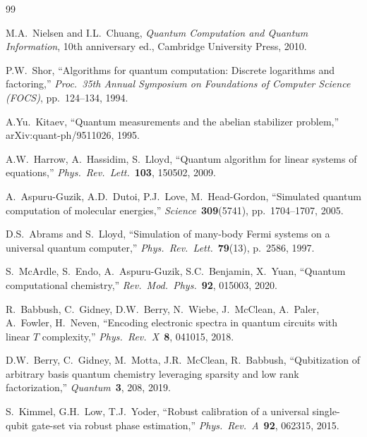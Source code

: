 \documentclass[12pt,a4paper]{article}
\begin{document}
\begin{thebibliography}{99}

M.A.\ Nielsen and I.L.\ Chuang,
\textit{Quantum Computation and Quantum Information},
10th anniversary ed., Cambridge University Press, 2010.

P.W.\ Shor,
``Algorithms for quantum computation: Discrete logarithms and factoring,''
\textit{Proc.\ 35th Annual Symposium on Foundations of Computer Science (FOCS)},
pp.\ 124--134, 1994.

A.Yu.\ Kitaev,
``Quantum measurements and the abelian stabilizer problem,''
arXiv:quant-ph/9511026, 1995.

A.W.\ Harrow, A.\ Hassidim, S.\ Lloyd,
``Quantum algorithm for linear systems of equations,''
\textit{Phys.\ Rev.\ Lett.}\ \textbf{103}, 150502, 2009.

A.\ Aspuru-Guzik, A.D.\ Dutoi, P.J.\ Love, M.\ Head-Gordon,
``Simulated quantum computation of molecular energies,''
\textit{Science}\ \textbf{309}(5741), pp.\ 1704--1707, 2005.

D.S.\ Abrams and S.\ Lloyd,
``Simulation of many-body Fermi systems on a universal quantum computer,''
\textit{Phys.\ Rev.\ Lett.}\ \textbf{79}(13), p.\ 2586, 1997.

S.\ McArdle, S.\ Endo, A.\ Aspuru-Guzik, S.C.\ Benjamin, X.\ Yuan,
``Quantum computational chemistry,''
\textit{Rev.\ Mod.\ Phys.}\ \textbf{92}, 015003, 2020.

R.\ Babbush, C.\ Gidney, D.W.\ Berry, N.\ Wiebe, J.\ McClean, A.\ Paler,
A.\ Fowler, H.\ Neven,
``Encoding electronic spectra in quantum circuits with linear $T$ complexity,''
\textit{Phys.\ Rev.\ X}\ \textbf{8}, 041015, 2018.

D.W.\ Berry, C.\ Gidney, M.\ Motta, J.R.\ McClean, R.\ Babbush,
``Qubitization of arbitrary basis quantum chemistry leveraging sparsity
and low rank factorization,''
\textit{Quantum}\ \textbf{3}, 208, 2019.

S.\ Kimmel, G.H.\ Low, T.J.\ Yoder,
``Robust calibration of a universal single-qubit gate-set via robust phase estimation,''
\textit{Phys.\ Rev.\ A}\ \textbf{92}, 062315, 2015.


\end{thebibliography}
\end{document}
